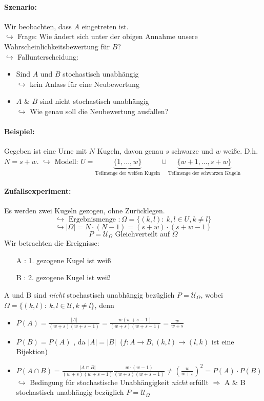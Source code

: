 \documentclass[12pt,a4paper]{article}
\begin{document}
 	
 	\paragraph{Szenario:}
 	Wir beobachten, dass $A$ eingetreten ist.\\
 	$\hookrightarrow$ Frage: Wie ändert sich unter der obigen Annahme unsere Wahrscheinlichkeitsbewertung für $B$?\\
 	$\hookrightarrow$ Fallunterscheidung:
 	\begin{itemize}
 	\item Sind $A$ und $B$ stochastisch unabhängig\\
 	$\hookrightarrow$ kein Anlass für eine Neubewertung
 	\item $A$ \& $B$ sind nicht stochastisch unabhängig\\
 	$\hookrightarrow$ Wie genau soll die Neubewertung ausfallen?
 	\end{itemize}
 	\paragraph{Beispiel:}
 	Gegeben ist eine Urne mit $N$ Kugeln, davon genau $s$ schwarze und $w$ weiße. D.h. $N=s+w$.
 	$\hookrightarrow$ Modell: $U=\underbrace{\{1,...,w\}}_{\text{Teilmenge der weißen Kugeln}} \cup\underbrace{\{ w+1,...,s+w\}}_{\text{Teilmenge der schwarzen Kugeln}}$
 	\paragraph{Zufallsexperiment:}
 	Es werden zwei Kugeln gezogen, ohne Zurücklegen.
 	$$\hookrightarrow \text{ Ergebnismenge }: \Omega =\{(k,l):\: k,l\in U, k\neq l\}$$
 	$$\hookrightarrow |\Omega | = N\cdot (N-1) = (s+w)\cdot (s+w-1)$$
 	$$P=\mathcal{U}_{\Omega} \text{ Gleichverteilt auf } \Omega$$
 	Wir betrachten die Ereignisse:
 	\begin{itemize}
 	\item[A]: 1. gezogene Kugel ist weiß
 	\item[B]: 2. gezogene Kugel ist weiß
 	\end{itemize}
 	
 	A und B sind \emph{nicht} stochastisch unabhängig bezüglich $P=\mathcal{U}_{\Omega}$, wobei $\Omega=\{(k,l):\: k,l\in\mathcal{U},k\neq l\}$, denn
 	\begin{itemize}
 	\item $P(A)=\frac{|A|}{(w+s)(w+s-1)}=\frac{w(w+s-1)}{(w+s)(w+s-1)}=\frac{w}{w+s}$
 	\item $P(B)=P(A)$ , da $|A|=|B| \:$ ($f:A\rightarrow B,(k,l)\rightarrow(l,k)$ ist eine Bijektion)
 	\item $P(A\cap B)=\frac{|A\cap B|}{(w+s)(w+s-1)}\frac{w\cdot (w-1)}{(w+s)(w+s-1)}\neq \left(\frac{w}{w+s}\right)^2=P(A)\cdot P(B)$\\
 	$\hookrightarrow$ Bedingung für stochastische Unabhängigkeit \emph{nicht} erfüllt $\Rightarrow$ A \& B stochastisch unabhängig bezüglich $P=\mathcal{U}_{\Omega}$
 	\end{itemize}
\end{document}
